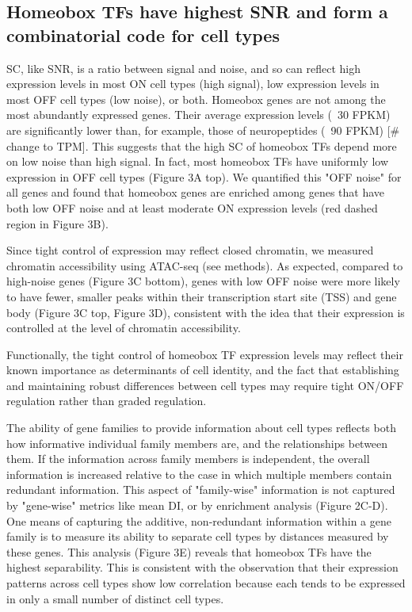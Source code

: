 \subsection{Homeobox TFs have highest SNR and form a combinatorial code for cell types}
SC, like SNR, is a ratio between signal and noise, and so can reflect high expression levels in most ON cell types (high signal), low expression levels in most OFF cell types (low noise), or both. Homeobox genes are not among the most abundantly expressed genes. Their average expression levels (~30 FPKM) are significantly lower than, for example, those of neuropeptides (~90 FPKM) [# change to TPM]. This suggests that the high SC of homeobox TFs depend more on low noise than high signal. In fact, most homeobox TFs have uniformly low expression in OFF cell types (Figure 3A top). We quantified this "OFF noise" for all genes and found that homeobox genes are enriched among genes that have both low OFF noise and at least moderate ON expression levels (red dashed region in Figure 3B).

Since tight control of expression may reflect closed chromatin, we measured chromatin accessibility using ATAC-seq (see methods). As expected, compared to high-noise genes (Figure 3C bottom), genes with low OFF noise were more likely to have fewer, smaller peaks within their transcription start site (TSS) and gene body (Figure 3C top, Figure 3D), consistent with the idea that their expression is controlled at the level of chromatin accessibility.

Functionally, the tight control of homeobox TF expression levels may reflect their known importance as determinants of cell identity, and the fact that establishing and maintaining robust differences between cell types may require tight ON/OFF regulation rather than graded regulation.

The ability of gene families to provide information about cell types reflects both how informative individual family members are, and the relationships between them. If the information across family members is independent, the overall information is increased relative to the case in which multiple members contain redundant information. This aspect of "family-wise" information is not captured by "gene-wise" metrics like mean DI, or by enrichment analysis (Figure 2C-D). One means of capturing the additive, non-redundant information within a gene family is to measure its ability to separate cell types by distances measured by these genes. This analysis (Figure 3E) reveals that homeobox TFs have the highest separability. This is consistent with the observation that their expression patterns across cell types show low correlation because each tends to be expressed in only a small number of distinct cell types. 


